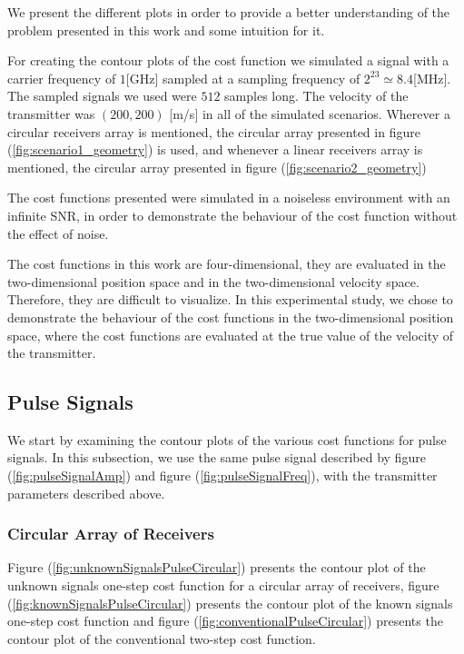 We present the different plots in order to provide a better understanding of the problem presented in this work and some intuition for it.

For creating the contour plots of the cost function we simulated a signal with a carrier frequency of $1$[GHz] sampled at a sampling frequency of $2^{23} \simeq 8.4$[MHz]. The sampled signals we used were $512$ samples long. The velocity of the transmitter was $(200,200)$ [m/s] in all of the simulated scenarios. Wherever a circular receivers array is mentioned, the circular array presented in figure (\ref{fig:scenario1_geometry}) is used, and whenever a linear receivers array is mentioned, the circular array presented in figure (\ref{fig:scenario2_geometry})

The cost functions presented were simulated in a noiseless environment with an infinite SNR, in order to demonstrate the behaviour of the cost function without the effect of noise.

The cost functions in this work are four-dimensional, they are evaluated in the two-dimensional position space and in the two-dimensional velocity space. Therefore, they are difficult to visualize. In this experimental study, we chose to demonstrate the behaviour of the cost functions in the two-dimensional position space, where the cost functions are evaluated at the true value of the velocity of the transmitter.


\subsection{Pulse Signals}

We start by examining the contour plots of the various cost functions for pulse signals. In this subsection, we use the same pulse signal described by figure (\ref{fig:pulseSignalAmp}) and figure (\ref{fig:pulseSignalFreq}), with the transmitter parameters described above.

\subsubsection*{Circular Array of Receivers}

Figure (\ref{fig:unknownSignalsPulseCircular}) presents the contour plot of the unknown signals one-step cost function for a circular array of receivers, figure (\ref{fig:knownSignalsPulseCircular}) presents the contour plot of the known signals one-step cost function and figure (\ref{fig:conventionalPulseCircular}) presents the contour plot of the conventional two-step cost function.

